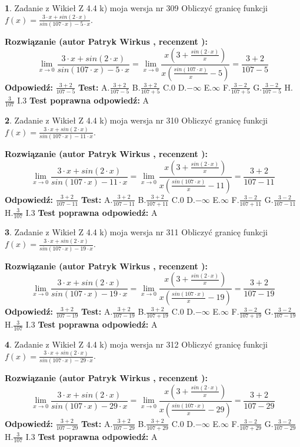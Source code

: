 \documentclass[12pt, a4paper]{article}
\theoremstyle{definition} %
\newtheorem{zad}{}
\newcommand{\zadStart}[1]{\begin{zad}#1\newline}
\newcommand{\zadStop}{\end{zad}}
\newcommand{\rozwStart}[2]{\noindent \textbf{Rozwiązanie (autor #1 , recenzent #2): }\newline}
\newcommand{\rozwStop}{\newline}
\newcommand{\odpStart}{\noindent \textbf{Odpowiedź:}\newline}
\newcommand{\odpStop}{\newline}
\newcommand{\testStart}{\noindent \textbf{Test:}\newline}
\newcommand{\testStop}{\newline}
\newcommand{\kluczStart}{\noindent \textbf{Test poprawna odpowiedź:}\newline}
\newcommand{\kluczStop}{\newline}
\begin{document}
\zadStart{Zadanie z Wikieł Z 4.4 k) moja wersja nr 309}
Obliczyć granicę funkcji $f(x)=\frac{3\cdot x +sin(2\cdot x)}{sin(107\cdot x) -5\cdot x}$.
\zadStop
\rozwStart{Patryk Wirkus}{}
$$\lim\limits_{x\to 0}\frac{3\cdot x +sin(2\cdot x)}{sin(107\cdot x) -5\cdot x}
=\lim\limits_{x\to 0}\frac{x(3+\frac{sin(2\cdot x)}{x})}{x(\frac{sin(107\cdot x)}{x}-5)}
=\frac{3+2}{107-5}$$
\rozwStop
\odpStart
$\frac{3+2}{107-5}$
\odpStop
\testStart
A.$\frac{3+2}{107-5}$
B.$\frac{3+2}{107+5}$
C.$0$
D.$-\infty$
E.$\infty$
F.$\frac{3-2}{107+5}$
G.$\frac{3-2}{107-5}$
H.$\frac{3}{107}$
I.$3$
\testStop
\kluczStart
A
\kluczStop



\zadStart{Zadanie z Wikieł Z 4.4 k) moja wersja nr 310}
Obliczyć granicę funkcji $f(x)=\frac{3\cdot x +sin(2\cdot x)}{sin(107\cdot x) -11\cdot x}$.
\zadStop
\rozwStart{Patryk Wirkus}{}
$$\lim\limits_{x\to 0}\frac{3\cdot x +sin(2\cdot x)}{sin(107\cdot x) -11\cdot x}
=\lim\limits_{x\to 0}\frac{x(3+\frac{sin(2\cdot x)}{x})}{x(\frac{sin(107\cdot x)}{x}-11)}
=\frac{3+2}{107-11}$$
\rozwStop
\odpStart
$\frac{3+2}{107-11}$
\odpStop
\testStart
A.$\frac{3+2}{107-11}$
B.$\frac{3+2}{107+11}$
C.$0$
D.$-\infty$
E.$\infty$
F.$\frac{3-2}{107+11}$
G.$\frac{3-2}{107-11}$
H.$\frac{3}{107}$
I.$3$
\testStop
\kluczStart
A
\kluczStop



\zadStart{Zadanie z Wikieł Z 4.4 k) moja wersja nr 311}
Obliczyć granicę funkcji $f(x)=\frac{3\cdot x +sin(2\cdot x)}{sin(107\cdot x) -19\cdot x}$.
\zadStop
\rozwStart{Patryk Wirkus}{}
$$\lim\limits_{x\to 0}\frac{3\cdot x +sin(2\cdot x)}{sin(107\cdot x) -19\cdot x}
=\lim\limits_{x\to 0}\frac{x(3+\frac{sin(2\cdot x)}{x})}{x(\frac{sin(107\cdot x)}{x}-19)}
=\frac{3+2}{107-19}$$
\rozwStop
\odpStart
$\frac{3+2}{107-19}$
\odpStop
\testStart
A.$\frac{3+2}{107-19}$
B.$\frac{3+2}{107+19}$
C.$0$
D.$-\infty$
E.$\infty$
F.$\frac{3-2}{107+19}$
G.$\frac{3-2}{107-19}$
H.$\frac{3}{107}$
I.$3$
\testStop
\kluczStart
A
\kluczStop



\zadStart{Zadanie z Wikieł Z 4.4 k) moja wersja nr 312}
Obliczyć granicę funkcji $f(x)=\frac{3\cdot x +sin(2\cdot x)}{sin(107\cdot x) -29\cdot x}$.
\zadStop
\rozwStart{Patryk Wirkus}{}
$$\lim\limits_{x\to 0}\frac{3\cdot x +sin(2\cdot x)}{sin(107\cdot x) -29\cdot x}
=\lim\limits_{x\to 0}\frac{x(3+\frac{sin(2\cdot x)}{x})}{x(\frac{sin(107\cdot x)}{x}-29)}
=\frac{3+2}{107-29}$$
\rozwStop
\odpStart
$\frac{3+2}{107-29}$
\odpStop
\testStart
A.$\frac{3+2}{107-29}$
B.$\frac{3+2}{107+29}$
C.$0$
D.$-\infty$
E.$\infty$
F.$\frac{3-2}{107+29}$
G.$\frac{3-2}{107-29}$
H.$\frac{3}{107}$
I.$3$
\testStop
\kluczStart
A
\kluczStop
\end{document}
